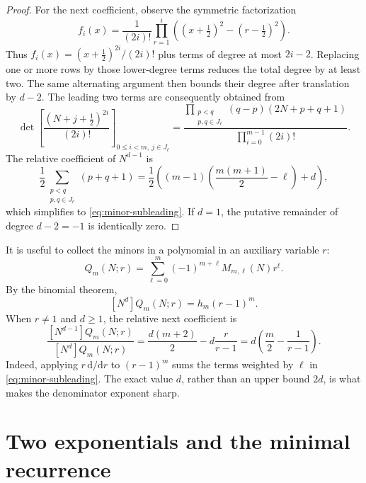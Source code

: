 \documentclass[11pt,a4paper]{article}
\numberwithin{equation}{section}
\theoremstyle{definition}
\theoremstyle{remark}
\newcommand{\dd}{\mathrm d}
\begin{document}
\begin{proof}
For the next coefficient, observe the symmetric factorization
\begin{equation}\label{eq:centered-binomial}
 f_i(x)=\frac1{(2i)!}\prod_{r=1}^{i}
          \left((x+\tfrac12)^2-(r-\tfrac12)^2\right).
\end{equation}
Thus $f_i(x)=(x+\tfrac12)^{2i}/(2i)!$ plus terms of degree at most
$2i-2$.  Replacing one or more rows by those lower-degree terms
reduces the total degree by at least two.  The same alternating
argument then bounds their degree after translation by $d-2$.
The leading two terms are consequently obtained from
\begin{equation}\label{eq:evenVand}
 \det\left[\frac{(N+j+\tfrac12)^{2i}}{(2i)!}\right]_
           {0\leq i<m,\ j\in J_\ell}
 =\frac{\displaystyle\prod_{\substack{p<q\\p,q\in J_\ell}}
        (q-p)(2N+p+q+1)}{\prod_{i=0}^{m-1}(2i)!}.
\end{equation}
The relative coefficient of $N^{d-1}$ is
\[
 \frac12\sum_{\substack{p<q\\p,q\in J_\ell}}(p+q+1)
 =\frac12\left((m-1)\left(\frac{m(m+1)}2-\ell\right)+d\right),
\]
which simplifies to \eqref{eq:minor-subleading}.  If $d=1$, the
putative remainder of degree $d-2=-1$ is identically zero.
\end{proof}

It is useful to collect the minors in a polynomial in an auxiliary
variable $r$:
\begin{equation}\label{eq:Q}
 Q_m(N;r)=\sum_{\ell=0}^{m}(-1)^{m+\ell}M_{m,\ell}(N)r^\ell.
\end{equation}
By the binomial theorem,
\begin{equation}\label{eq:Q-leading}
 [N^d]Q_m(N;r)=h_m(r-1)^m.
\end{equation}
When $r\ne1$ and $d\geq1$, the relative next coefficient is
\begin{equation}\label{eq:Q-subleading}
 \frac{[N^{d-1}]Q_m(N;r)}{[N^d]Q_m(N;r)}
 =\frac{d(m+2)}2-d\frac{r}{r-1}
 =d\left(\frac m2-\frac1{r-1}\right).
\end{equation}
Indeed, applying $r\,\dd/\dd r$ to $(r-1)^m$ sums the terms weighted
by $\ell$ in \eqref{eq:minor-subleading}.  The exact value $d$, rather
than an upper bound $2d$, is what makes the denominator exponent sharp.

\section{Two exponentials and the minimal recurrence}\label{sec:recurrence}
\end{document}
